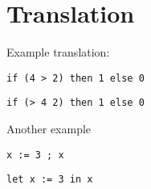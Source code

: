 \documentclass[11pt, leqno]{article}
\begin{document}
\section{Translation}
Example translation:\\
\begin{center}
  \begin{minipage}{0.45\linewidth}
    \begin{lstlisting}[language=pwhile]
      if (4 > 2) then 1 else 0
    \end{lstlisting}
  \end{minipage}
  \begin{minipage}{0.45\linewidth}
    \begin{lstlisting}[language=rml]
      if (> 4 2) then 1 else 0
    \end{lstlisting}
  \end{minipage}
\end{center}
Another example
\begin{center}
  \begin{minipage}{0.45\linewidth}
    \begin{lstlisting}[language=pwhile]
      x := 3 ; x
    \end{lstlisting}
  \end{minipage}
  \begin{minipage}{0.45\linewidth}
    \begin{lstlisting}[language=rml]
      let x := 3 in x
    \end{lstlisting}
  \end{minipage}
\end{center}
\end{document}
